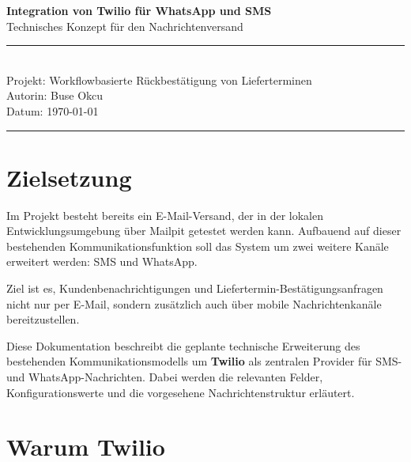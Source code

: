 \documentclass[12pt,a4paper]{article}
\begin{document}
\begin{titlepage}
    \centering

    \vspace*{3cm}

    {\Huge\textbf{Integration von Twilio für WhatsApp und SMS}}\\[0.8cm]

    {\Large Technisches Konzept für den Nachrichtenversand}\\[2cm]

    \rule{13cm}{0.5pt}\\[0.5cm]

    {\large Projekt: Workflowbasierte Rückbestätigung von Lieferterminen}\\[0.3cm]
    {\large Autorin: Buse Okcu}\\[0.3cm]
    {\large Datum: \today}\\[0.5cm]

    \rule{13cm}{0.5pt}

    \vfill
\end{titlepage}

\tableofcontents
\newpage

\section{Zielsetzung}

Im Projekt besteht bereits ein E-Mail-Versand, der in der lokalen
Entwicklungsumgebung über Mailpit getestet werden kann. Aufbauend auf
dieser bestehenden Kommunikationsfunktion soll das System um zwei weitere Kanäle erweitert werden: SMS und WhatsApp.

Ziel ist es, Kundenbenachrichtigungen und
Liefertermin-Bestätigungsanfragen nicht nur per E-Mail, sondern
zusätzlich auch über mobile Nachrichtenkanäle bereitzustellen.

Diese Dokumentation beschreibt die geplante technische Erweiterung des
bestehenden Kommunikationsmodells um \textbf{Twilio} als zentralen
Provider für SMS- und WhatsApp-Nachrichten. Dabei werden die relevanten
Felder, Konfigurationswerte und die vorgesehene Nachrichtenstruktur
erläutert.

\section{Warum Twilio}
\end{document}
